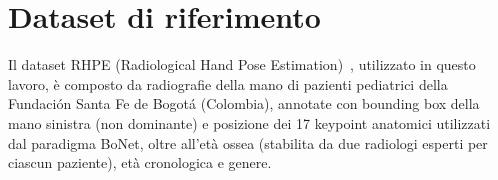 \section{Dataset di riferimento}

Il dataset RHPE (Radiological Hand Pose Estimation)~\cite{escobar2019bonet},
utilizzato in questo lavoro, è composto da radiografie della mano di
pazienti pediatrici della Fundación Santa Fe de Bogotá (Colombia),
annotate con bounding box della mano sinistra (non dominante) e
posizione dei 17 keypoint anatomici utilizzati dal paradigma BoNet,
oltre all'età ossea (stabilita da due radiologi esperti per ciascun
paziente), età cronologica e genere.
